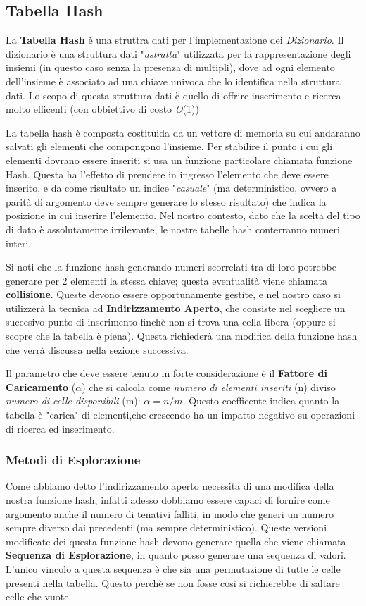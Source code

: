 \documentclass{article}
\newcommand{\bigO}{\emph{O}}
\begin{document}
\subsection{Tabella Hash}

La \textbf{Tabella Hash} è una struttra dati per l'implementazione dei \emph{Dizionario}. Il dizionario è una struttura dati "\emph{astratta}" utilizzata per la rappresentazione degli insiemi (in questo caso senza la presenza di multipli), dove ad ogni elemento dell'insieme è associato ad una chiave univoca che lo identifica nella struttura dati. Lo scopo di questa struttura dati è quello di offrire inserimento e ricerca molto efficenti (con obbiettivo di costo \bigO(1)) 

La tabella hash è composta costituida da un vettore di memoria su cui andaranno salvati gli elementi che compongono l'insieme. Per stabilire il punto i cui gli elementi dovrano essere inseriti si usa un funzione particolare chiamata funzione Hash. Questa ha l'effetto di prendere in ingresso l'elemento che deve essere inserito, e da come risultato un indice "\emph{casuale}" (ma deterministico, ovvero a parità di argomento deve sempre generare lo stesso risultato) che indica la posizione in cui inserire l'elemento. Nel nostro contesto, dato che la scelta del tipo di dato è assolutamente irrilevante, le nostre tabelle hash conterranno numeri interi.

Si noti che la funzione hash generando numeri scorrelati tra di loro potrebbe generare per 2 elementi la stessa chiave; questa eventualità viene chiamata \textbf{collisione}. Queste devono essere opportunamente gestite, e nel nostro caso si utilizzerà la tecnica ad \textbf{Indirizzamento Aperto}, che consiste nel scegliere un succesivo punto di inserimento finchè non si trova una cella libera (oppure si scopre che la tabella è piena). Questa richiederà una modifica della funzione hash che verrà discussa nella sezione successiva.

Il parametro che deve essere tenuto in forte considerazione è il \textbf{Fattore di Caricamento} ($\alpha$) che si calcola come \emph{numero di elementi inseriti} (n) diviso \emph{numero di celle disponibili} (m): $\alpha = n / m$.
Questo coefficente indica quanto la tabella è "carica" di elementi,che crescendo ha un impatto negativo su operazioni di ricerca ed inserimento.

\subsubsection{Metodi di Esplorazione}
Come abbiamo detto l'indirizzamento aperto necessita di una modifica della nostra funzione hash, infatti adesso dobbiamo essere capaci di fornire come argomento anche il numero di tenativi falliti, in modo che generi un numero sempre diverso dai precedenti (ma sempre deterministico). Queste versioni modificate dei questa funzione hash devono generare quella che viene chiamata \textbf{Sequenza di Esplorazione}, in quanto posso generare una sequenza di valori. L'unico vincolo a questa sequenza è che sia una permutazione di tutte le celle presenti nella tabella. Questo perchè se non fosse così si richierebbe di saltare celle che vuote.
\end{document}
